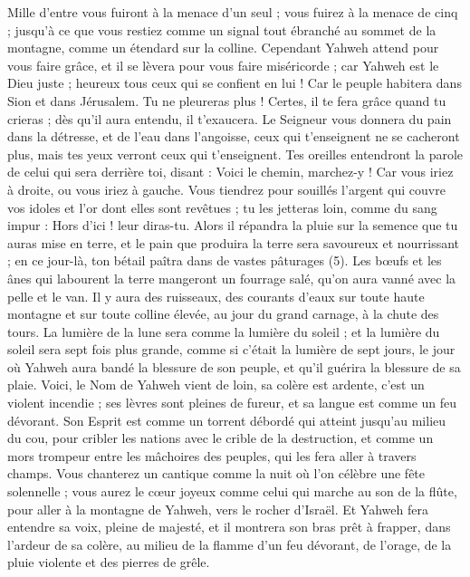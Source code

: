 \begin{multicols}{2}
Mille d'entre vous fuiront à la menace d'un seul ; vous fuirez à la menace de cinq ; jusqu'à ce que vous restiez comme un signal tout ébranché au sommet de la montagne, comme un étendard sur la colline.
Cependant Yahweh attend pour vous faire grâce, et il se lèvera pour vous faire miséricorde ; car Yahweh est le Dieu juste ; heureux tous ceux qui se confient en lui !
Car le peuple habitera dans Sion et dans Jérusalem. Tu ne pleureras plus ! Certes, il te fera grâce quand tu crieras ; dès qu’il aura entendu, il t'exaucera.
Le Seigneur vous donnera du pain dans la détresse, et de l'eau dans l’angoisse, ceux qui t’enseignent ne se cacheront plus, mais tes yeux verront ceux qui t’enseignent.
Tes oreilles entendront la parole de celui qui sera derrière toi, disant : Voici le chemin, marchez-y ! Car vous iriez à droite, ou vous iriez à gauche.
Vous tiendrez pour souillés l’argent qui couvre vos idoles et l’or dont elles sont revêtues ; tu les jetteras loin, comme du sang impur : Hors d’ici ! leur diras-tu.
Alors il répandra la pluie sur la semence que tu auras mise en terre, et le pain que produira la terre sera savoureux et nourrissant ; en ce jour-là, ton bétail paîtra dans de vastes pâturages (5).
Les bœufs et les ânes qui labourent la terre mangeront un fourrage salé, qu’on aura vanné avec la pelle et le van.
Il y aura des ruisseaux, des courants d’eaux sur toute haute montagne et sur toute colline élevée, au jour du grand carnage, à la chute des tours.
La lumière de la lune sera comme la lumière du soleil ; et la lumière du soleil sera sept fois plus grande, comme si c'était la lumière de sept jours, le jour où Yahweh aura bandé la blessure de son peuple, et qu'il guérira la blessure de sa plaie.
Voici, le Nom de Yahweh vient de loin, sa colère est ardente, c’est un violent incendie ; ses lèvres sont pleines de fureur, et sa langue est comme un feu dévorant.
Son Esprit est comme un torrent débordé qui atteint jusqu’au milieu du cou, pour cribler les nations avec le crible de la destruction, et comme un mors trompeur entre les mâchoires des peuples, qui les fera aller à travers champs.
Vous chanterez un cantique comme la nuit où l’on célèbre une fête solennelle ; vous aurez le cœur joyeux comme celui qui marche au son de la flûte, pour aller à la montagne de Yahweh, vers le rocher d'Israël.
Et Yahweh fera entendre sa voix, pleine de majesté, et il montrera son bras prêt à frapper, dans l’ardeur de sa colère, au milieu de la flamme d’un feu dévorant, de l’orage, de la pluie violente et des pierres de grêle.

\end{multicols}
